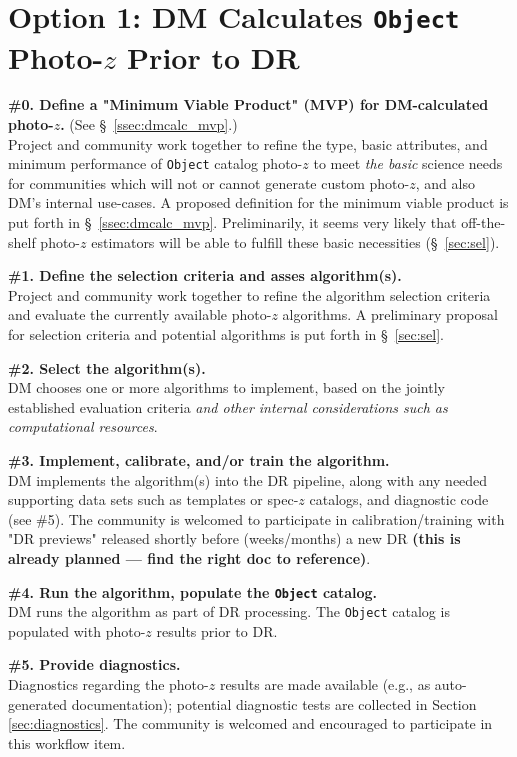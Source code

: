 \documentclass[DM,lsstdraft,toc]{lsstdoc}
\begin{document}
\clearpage
\section{Option 1: DM Calculates {\tt Object} Photo-$z$ Prior to DR}\label{sec:dmcalc}

{\bf \#0. Define a "Minimum Viable Product" (MVP) for DM-calculated photo-$z$.} (See \S~\ref{ssec:dmcalc_mvp}.)\\
Project and community work together to refine the type, basic attributes, and minimum performance of {\tt Object} catalog photo-$z$ to meet {\it the basic} science needs for communities which will not or cannot generate custom photo-$z$, and also DM's internal use-cases.
A proposed definition for the minimum viable product is put forth in \S~\ref{ssec:dmcalc_mvp}.
Preliminarily, it seems very likely that off-the-shelf photo-$z$ estimators will be able to fulfill these basic necessities (\S~\ref{sec:sel}).

{\bf \#1. Define the selection criteria and asses algorithm(s).}\\
Project and community work together to refine the algorithm selection criteria and evaluate the currently available photo-$z$ algorithms.
A preliminary proposal for selection criteria and potential algorithms is put forth in \S~\ref{sec:sel}.

{\bf \#2. Select the algorithm(s).}\\
DM chooses one or more algorithms to implement, based on the jointly established evaluation criteria {\it and other internal considerations such as computational resources}.

{\bf \#3. Implement, calibrate, and/or train the algorithm.}\\
DM implements the algorithm(s) into the DR pipeline, along with any needed supporting data sets such as templates or spec-$z$ catalogs, and diagnostic code (see \#5).
The community is welcomed to participate in calibration/training with "DR previews" released shortly before (weeks/months) a new DR {\bf (this is already planned --- find the right doc to reference)}.

{\bf \#4. Run the algorithm, populate the {\tt Object} catalog.}\\
DM runs the algorithm as part of DR processing.
The {\tt Object} catalog is populated with photo-$z$ results prior to DR.

{\bf \#5. Provide diagnostics.}\\
Diagnostics regarding the photo-$z$ results are made available (e.g., as auto-generated documentation); potential diagnostic tests are collected in Section \ref{sec:diagnostics}.
The community is welcomed and encouraged to participate in this workflow item.
\end{document}
